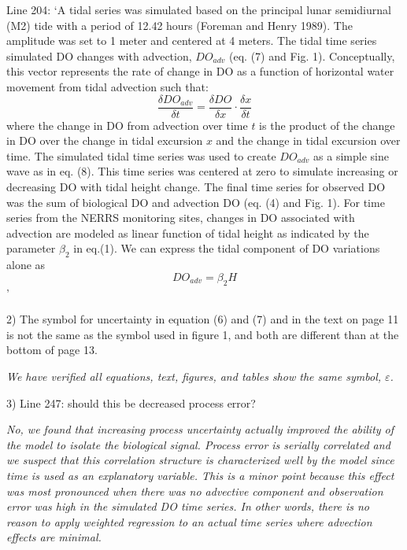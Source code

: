 \documentclass[letterpaper,12pt]{article}\usepackage[]{graphicx}\usepackage[]{color}
\begin{document}
{Line 204: `A tidal series was simulated based on the principal lunar semidiurnal (M2) tide with a period of 12.42 hours (Foreman and Henry 1989).  The amplitude was set to 1 meter and centered  at 4 meters.  The tidal time series simulated DO changes with advection, $DO_{adv}$ (eq. (7) and Fig. 1). Conceptually, this vector represents the rate of change in DO as a function of horizontal water movement from tidal advection such that:
\begin{equation} \tag{10}
\frac{\delta DO_{adv}}{\delta t} = \frac{\delta DO}{\delta x} \cdot \frac{\delta x}{\delta t}
\end{equation}
where the change in DO from advection over time $t$ is the product of the change in DO over the change in tidal excursion $x$ and the change in tidal excursion over time.  The simulated tidal time series was used to create $DO_{adv}$ as a simple sine wave as in eq. (8).  This time series was centered at zero to simulate increasing or decreasing DO with tidal height change.  The final time series for observed DO was the sum of biological DO and advection DO (eq. (4) and Fig. 1). For time series from the NERRS monitoring sites, changes in DO associated with advection are modeled as linear function of tidal height as indicated by the parameter $\beta_{2}$ in eq.(1).  We can express the tidal component of DO variations alone as
\begin{equation} \tag{11}
DO_{adv} = \beta_{2}H
\end{equation}'
}

2) The symbol for uncertainty in equation (6) and (7) and in the text on page 11 is not the same as the symbol used in figure 1, and both are different than at the bottom of page 13.

{\it We have verified all equations, text, figures, and tables show the same symbol, $\varepsilon$.}

3) Line 247: should this be decreased process error?

{\it No, we found that increasing process uncertainty actually improved the ability of the model to isolate the biological signal.  Process error is serially correlated and we suspect that this correlation structure is characterized well by the model since time is used as an explanatory variable.  This is a minor point because this effect was most pronounced when there was no advective component and observation error was high in the simulated DO time series.  In other words, there is no reason to apply weighted regression to an actual time series where advection effects are minimal.}
\end{document}
